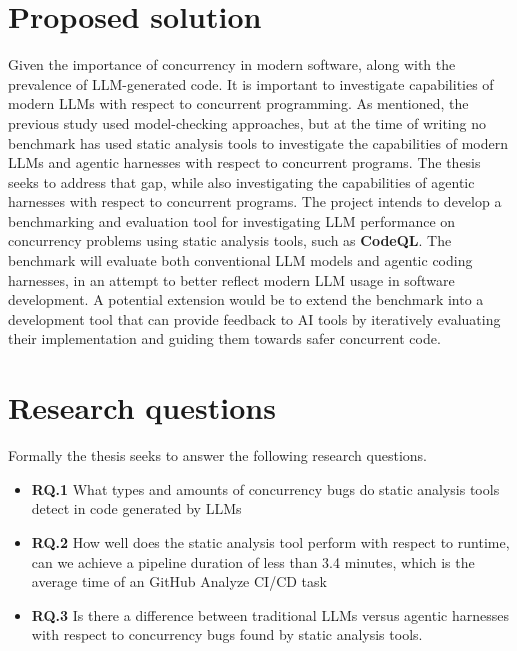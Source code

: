 \documentclass[12pt,a4paper]{article}
\begin{document}
\section{Proposed solution}
Given the importance of concurrency in modern software, along with the prevalence of LLM-generated code. It is important to investigate capabilities of modern LLMs with respect to concurrent programming. As mentioned, the previous study \cite{huang2026concur} used model-checking approaches, but at the time of writing no benchmark has used static analysis tools to investigate the capabilities of modern LLMs and agentic harnesses with respect to concurrent programs. The thesis seeks to address that gap, while also investigating the capabilities of agentic harnesses with respect to concurrent programs. \newline{}
The project intends to develop a benchmarking and evaluation tool for investigating LLM performance on concurrency problems using static analysis tools, such as \textbf{CodeQL}. The benchmark will evaluate both conventional LLM models and agentic coding harnesses, in an attempt to better reflect modern LLM usage in software development. A potential extension would be to extend the benchmark into a development tool that can provide feedback to AI tools by iteratively evaluating their implementation and guiding them towards safer concurrent code.	

\section{Research questions}
Formally the thesis seeks to answer the following research questions.
\begin{itemize}
	\item{\textbf{RQ.1} What types and amounts of concurrency bugs do static analysis tools detect in code generated by LLMs}
	\item{\textbf{RQ.2} How well does the static analysis tool perform with respect to runtime, can we achieve a pipeline duration of less than 3.4 minutes, which is the average time of an GitHub Analyze CI/CD task \cite{bouzenia2024resource} }
	\item{\textbf{RQ.3} Is there a difference between traditional LLMs versus agentic harnesses with respect to concurrency bugs found by static analysis tools.}
\end{itemize}
\printbibliography
\end{document}
